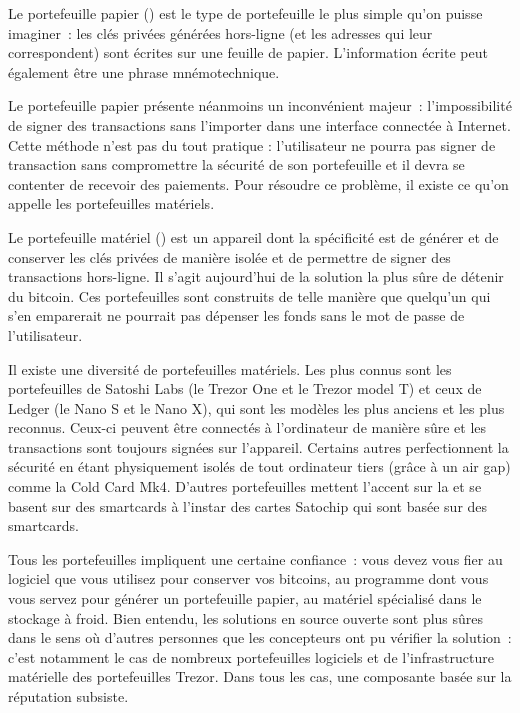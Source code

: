 Le portefeuille papier () est le type de portefeuille le plus simple qu'on puisse imaginer~: les clés privées générées hors-ligne (et les adresses qui leur correspondent) sont écrites sur une feuille de papier. L'information écrite peut également être une phrase mnémotechnique.

Le portefeuille papier présente néanmoins un inconvénient majeur~: l'impossibilité de signer des transactions sans l'importer dans une interface connectée à Internet. Cette méthode n'est pas du tout pratique : l'utilisateur ne pourra pas signer de transaction sans compromettre la sécurité de son portefeuille et il devra se contenter de recevoir des paiements. Pour résoudre ce problème, il existe ce qu'on appelle les portefeuilles matériels.

Le portefeuille matériel () est un appareil dont la spécificité est de générer et de conserver les clés privées de manière isolée et de permettre de signer des transactions hors-ligne. Il s'agit aujourd'hui de la solution la plus sûre de détenir du bitcoin. Ces portefeuilles sont construits de telle manière que quelqu'un qui s'en emparerait ne pourrait pas dépenser les fonds sans le mot de passe de l'utilisateur.

Il existe une diversité de portefeuilles matériels. Les plus connus sont les portefeuilles de Satoshi Labs (le Trezor One et le Trezor model T) et ceux de Ledger (le Nano S et le Nano X), qui sont les modèles les plus anciens et les plus reconnus. Ceux-ci peuvent être connectés à l'ordinateur de manière sûre et les transactions sont toujours signées sur l'appareil. Certains autres perfectionnent la sécurité en étant physiquement isolés de tout ordinateur tiers (grâce à un air gap) comme la Cold Card Mk4. D'autres portefeuilles mettent l'accent sur la  et se basent sur des smartcards à l'instar des cartes Satochip qui sont basée sur des smartcards. 

Tous les portefeuilles impliquent une certaine confiance~: vous devez vous fier au logiciel que vous utilisez pour conserver vos bitcoins, au programme dont vous vous servez pour générer un portefeuille papier, au matériel spécialisé dans le stockage à froid. Bien entendu, les solutions en source ouverte sont plus sûres dans le sens où d'autres personnes que les concepteurs ont pu vérifier la solution~: c'est notamment le cas de nombreux portefeuilles logiciels et de l'infrastructure matérielle des portefeuilles Trezor. Dans tous les cas, une composante basée sur la réputation subsiste.

